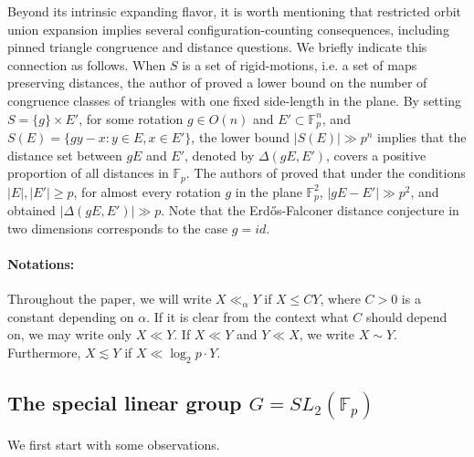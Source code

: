 \documentclass[11pt]{article}
\begin{document}
Beyond its intrinsic expanding flavor, it is worth mentioning that restricted orbit union expansion implies several configuration-counting consequences, including pinned triangle congruence and distance questions. We briefly indicate this connection as follows. When $S$ is a set of rigid-motions, i.e. a set of maps preserving distances, the author of \cite{Pham2024} proved a lower bound on the number of congruence classes of triangles with one fixed side-length in the plane. By setting $S=\{g\}\times E'$, for some rotation $g\in O(n)$ and $E'\subset \mathbb{F}_p^n$, and $S(E)=\{gy-x\colon y\in E, x\in E'\}$, the lower bound $|S(E)|\gg p^n$ implies that the distance set between $gE$ and $E'$, denoted by $\Delta(gE, E')$, covers a positive proportion of all distances in $\mathbb{F}_p$. The authors of \cite{PS} proved that under the conditions $|E|, |E'|\ge p$, for almost every rotation $g$ in the plane $\mathbb{F}_p^2$, $|gE-E'|\gg p^2$, and obtained $|\Delta(gE, E')|\gg p$. Note that the Erd\H{o}s-Falconer distance conjecture in two dimensions corresponds to the case $g=id$. 

 




\paragraph{Notations:} Throughout the paper, we will write $X \ll_\alpha Y$ if $X \le CY$, where $C>0$ is a constant depending on $\alpha$. If it is clear from the context what $C$ should depend on, we may write only $X \ll Y$. If $X \ll Y $ and $Y\ll X$, we write $X \sim Y$. Furthermore, $X \lesssim Y$ if $X \ll \log_2p\cdot Y$.  

\subsection{The special linear group \texorpdfstring{$G=SL_2(\mathbb{F}_p)$}{SL2(Fp)}}
We first start with some observations. 
\end{document}
